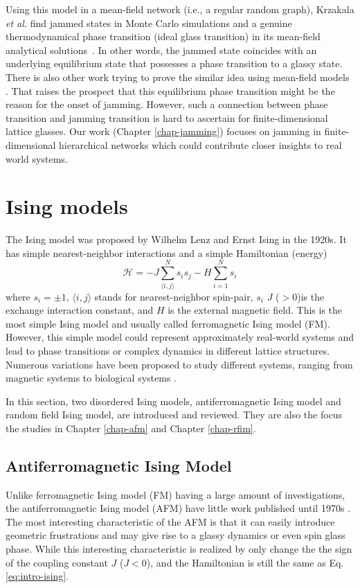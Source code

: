 Using this model in a mean-field network 
(i.e., a regular random graph), Krzakala \textit{et al.} find
jammed states in Monte Carlo simulations and a genuine thermodynamical
phase transition (ideal glass transition) in its mean-field analytical
solutions~\cite{Krzakala2008}. In other words, the jammed state coincides
with an underlying equilibrium state that possesses a phase transition
to a glassy state. There is also other work trying to prove the similar idea using mean-field models \cite{Rivoire03,berthier2011theory, Parisi2010}. That raises the prospect that this equilibrium phase transition might be the reason for the onset of jamming. However, such a connection between phase transition and jamming transition is hard to ascertain for finite-dimensional lattice glasses. Our work (Chapter \ref{chap-jamming}) focuses on jamming in finite-dimensional hierarchical networks which could contribute closer insights to real world systems.



\section{Ising models}
The Ising model was proposed by Wilhelm Lenz and Ernst Ising \cite{ising1925contribution, brush1967history} in the 1920s. It has simple nearest-neighbor interactions and a simple Hamiltonian (energy)
\begin{equation}
\mathcal{H}=-J \sum_{\langle i, j\rangle}^N s_i s_j - H \sum_{i=1}^N s_i
\label{eq:intro-ising}
\end{equation}
where $s_i=\pm1$, $\langle i, j\rangle$ stands for nearest-neighbor spin-pair, $s_i$ $J$ ($>0$)is the exchange interaction constant, and $H$ is the external magnetic field. This is the most simple Ising model and usually called ferromagnetic Ising model (FM).
However, this simple model could represent approximately real-world systems and lead to phase transitions \cite{onsager1944} or complex dynamics \cite{fredrickson1984kinetic} in different lattice structures. 
Numerous variations have been proposed to study different systems, ranging from magnetic systems \cite{blundell2001magnetism} to biological systems \cite{hopfield1982neural}.

In this section, two disordered Ising models, antiferromagnetic Ising model and random field Ising model,  are introduced and reviewed. They are also the focus the studies in Chapter \ref{chap-afm} and Chapter \ref{chap-rfim}.
\subsection{Antiferromagnetic Ising Model}
\label{sec:intro-afm}
Unlike ferromagnetic Ising model (FM) having a large amount of investigations, the antiferromagnetic Ising model (AFM) have little work published until 1970s \cite{penney2003new}. The most interesting characteristic of the AFM is that it can easily introduce geometric frustrations and may give rise to a glassy dynamics or even spin glass phase. While this interesting characteristic is realized by only change the the sign of the coupling constant $J$ ($J<0$), and the Hamiltonian is still the same as Eq. \ref{eq:intro-ising}.



